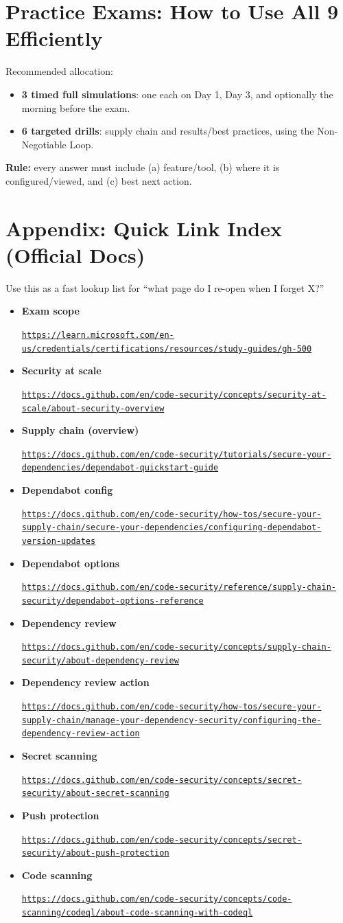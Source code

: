 \documentclass[11pt]{article}
\newcommand{\DocLink}[2]{%
  \item \textbf{#1}\par
  \noindent\href{#2}{\nolinkurl{#2}}%
}
\begin{document}
\section{Practice Exams: How to Use All 9 Efficiently}
Recommended allocation:

\begin{itemize}
  \item \textbf{3 timed full simulations}: one each on Day 1, Day 3, and optionally the morning before the exam.
  \item \textbf{6 targeted drills}: supply chain and results/best practices, using the Non-Negotiable Loop.
\end{itemize}

\noindent \textbf{Rule:} every answer must include (a) feature/tool, (b) where it is configured/viewed, and (c) best next action.

\section{Appendix: Quick Link Index (Official Docs)}
Use this as a fast lookup list for ``what page do I re-open when I forget X?''

\begin{itemize}
  \DocLink{Exam scope}{https://learn.microsoft.com/en-us/credentials/certifications/resources/study-guides/gh-500}
  \DocLink{Security at scale}{https://docs.github.com/en/code-security/concepts/security-at-scale/about-security-overview}
  \DocLink{Supply chain (overview)}{https://docs.github.com/en/code-security/tutorials/secure-your-dependencies/dependabot-quickstart-guide}
  \DocLink{Dependabot config}{https://docs.github.com/en/code-security/how-tos/secure-your-supply-chain/secure-your-dependencies/configuring-dependabot-version-updates}
  \DocLink{Dependabot options}{https://docs.github.com/en/code-security/reference/supply-chain-security/dependabot-options-reference}
  \DocLink{Dependency review}{https://docs.github.com/en/code-security/concepts/supply-chain-security/about-dependency-review}
  \DocLink{Dependency review action}{https://docs.github.com/en/code-security/how-tos/secure-your-supply-chain/manage-your-dependency-security/configuring-the-dependency-review-action}
  \DocLink{Secret scanning}{https://docs.github.com/en/code-security/concepts/secret-security/about-secret-scanning}
  \DocLink{Push protection}{https://docs.github.com/en/code-security/concepts/secret-security/about-push-protection}
  \DocLink{Code scanning}{https://docs.github.com/en/code-security/concepts/code-scanning/codeql/about-code-scanning-with-codeql}
\end{itemize}
\end{document}
